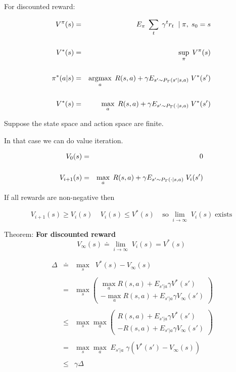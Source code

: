 {

For discounted reward:

\begin{eqnarray*}
  V^\pi(s) & = & E_\pi\;\sum_t \;\gamma^t r_t  \;\;|\; \pi, \; s_0 = s \\
  \\
  V^*(s) & = & \sup_\pi \;V^\pi(s) \\
  \\
  \pi^*(a|s) & = & \operatorname*{argmax}_a\;R(s,a) + \gamma E_{s' \sim P_T(s'|s,a)}\;V^*(s') \\
  \\
  V^*(s) & = & \max_a\; R(s,a) + \gamma E_{s' \sim P_T(\cdot|s,a)}\;V^*(s')
\end{eqnarray*}


Suppose the state space and action space are finite.

\vfill
In that case we can do value iteration.

\begin{eqnarray*}
  V_0(s) & = & 0 \\
  \\
  V_{i+1}(s) & = & \max_a\; R(s,a) + \gamma E_{s' \sim P_T(\cdot|s,a)}\;V_i(s')
\end{eqnarray*}

\vfill
If all rewards are non-negative then

$$V_{i+1}(s) \geq V_i(s)\;\;\;\;V_i(s) \leq V^*(s)\;\;\;\;\mathrm{so}\;\lim_{i \rightarrow \infty}\;V_i(s)\;\mathrm{exists}$$


Theorem: {\bf For discounted reward}
\vfill
$$V_\infty(s) \doteq \lim_{i \rightarrow \infty}\;V_i(s) = V^*(s)$$


\begin{eqnarray*}
  \;\Delta & \doteq & \max_s\;\;V^*(s) - V_\infty(s) \\
  \\
  & = & \max_s \left(\begin{array}{l} \max_a R(s,a) + E_{s'|a} \gamma V^*(s') \\ - \max_a R(s,a) + E_{s'|a} \gamma V_\infty(s')\end{array}\right) \\
  \\
    & \leq & \max_s \max_a \left(\begin{array}{l} R(s,a) + E_{s'|a} \gamma V^*(s') \\ - R(s,a) + E_{s'|a} \gamma V_\infty(s')\end{array}\right) \\
  \\
  & = & \max_s \max_a \;E_{s'|a}\; \gamma (V^*(s') - V_\infty(s)) \\
  \\  
  & \leq & \gamma \Delta
\end{eqnarray*}


}
